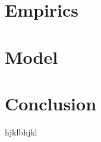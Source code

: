 \documentclass[14pt]{article}
\begin{document}
\section{Empirics}



\section{Model}




\section{Conclusion}
hjklbhjkl







 
\end{document}
